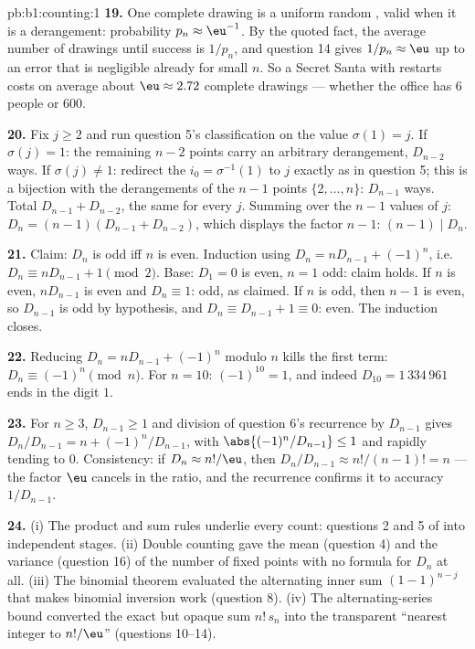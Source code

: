 \begin{solution}{pb:b1:counting:1}
\textbf{19.} One complete drawing is a uniform random ,
valid when it is a derangement: probability $p_n \approx \eu^{-1}$.
By the quoted fact, the average number of drawings until success is
$1/p_n$, and question 14 gives $1/p_n \approx \eu$ up to an error
that is negligible already for small $n$. So a Secret Santa with
restarts costs on average about $\eu \approx 2.72$ complete
drawings --- whether the office has $6$ people or $600$.

\textbf{20.} Fix $j \geq 2$ and run question 5's classification on
the value $\sigma(1) = j$. If $\sigma(j) = 1$: the remaining
$n - 2$ points carry an arbitrary derangement, $D_{n-2}$ ways. If
$\sigma(j) \neq 1$: redirect the  $i_0 = \sigma^{-1}(1)$ to
$j$ exactly as in question 5; this is a bijection with the
derangements of the $n - 1$ points $\{2, \dots, n\}$: $D_{n-1}$
ways. Total $D_{n-1} + D_{n-2}$, the same for every $j$. Summing
over the $n - 1$ values of $j$: $D_n = (n-1)(D_{n-1} + D_{n-2})$,
which displays the factor $n - 1$: $(n-1) \mid D_n$.

\textbf{21.} Claim: $D_n$ is odd iff $n$ is even. Induction using
$D_n = nD_{n-1} + (-1)^n$, i.e.\ $D_n \equiv nD_{n-1} + 1 \pmod 2$.
Base: $D_1 = 0$ is even, $n = 1$ odd: claim holds. If $n$ is even,
$nD_{n-1}$ is even and $D_n \equiv 1$: odd, as claimed. If $n$ is
odd, then $n - 1$ is even, so $D_{n-1}$ is odd by hypothesis, and
$D_n \equiv D_{n-1} + 1 \equiv 0$: even. The induction closes.

\textbf{22.} Reducing $D_n = nD_{n-1} + (-1)^n$ modulo $n$ kills
the first term: $D_n \equiv (-1)^n \pmod n$. For $n = 10$:
$(-1)^{10} = 1$, and indeed $D_{10} = 1\,334\,961$ ends in the
digit $1$.

\textbf{23.} For $n \geq 3$, $D_{n-1} \geq 1$ and division of
question 6's recurrence by $D_{n-1}$ gives $D_n/D_{n-1} = n +
(-1)^n/D_{n-1}$, with $\abs{(-1)^n/D_{n-1}} \leq 1$ and rapidly
tending to $0$. Consistency: if $D_n \approx n!/\eu$, then
$D_n/D_{n-1} \approx n!/(n-1)! = n$ --- the factor $\eu$ cancels
in the ratio, and the recurrence confirms it to accuracy
$1/D_{n-1}$.

\textbf{24.} (i) The product and sum rules underlie every count:
questions 2 and 5   of  into independent
stages. (ii) Double counting gave the mean (question 4) and the
variance (question 16) of the number of fixed points with no
formula for $D_n$ at all. (iii) The binomial theorem evaluated the
alternating inner sum $(1-1)^{n-j}$ that makes binomial inversion
work (question 8). (iv) The alternating-series bound converted the
exact but opaque sum $n!\,s_n$ into the transparent 
``nearest integer to $n!/\eu$'' (questions 10--14).


\end{solution}
